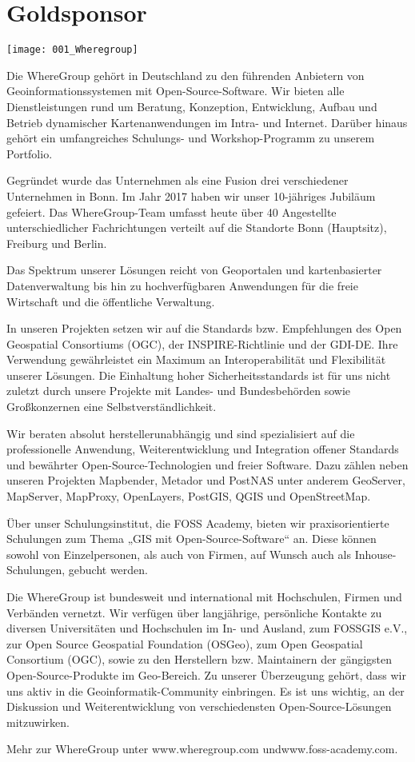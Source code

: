 \section*{Goldsponsor}
\begin{center}
	\texttt{[image: 001\_Wheregroup]}
\end{center}
Die WhereGroup gehört in Deutschland zu den führenden Anbietern von Geoinformationssystemen mit
Open-Source-Software. Wir bieten alle Dienstleistungen rund um Beratung, Konzeption, Entwicklung,
Aufbau und Betrieb dynamischer Kartenanwendungen im Intra- und Internet. Darüber hinaus gehört ein
umfangreiches Schulungs- und Workshop-Programm zu unserem Portfolio.

Gegründet wurde das Unternehmen als eine Fusion drei verschiedener Unternehmen in Bonn. Im Jahr 2017
haben wir unser 10-jähriges Jubiläum gefeiert. Das WhereGroup-Team umfasst heute über 40 Angestellte
unterschiedlicher Fachrichtungen verteilt auf die Standorte Bonn (Hauptsitz), Freiburg und Berlin.

Das Spektrum unserer Lösungen reicht von Geoportalen und kartenbasierter Datenverwaltung bis hin zu
hochverfügbaren Anwendungen für die freie Wirtschaft und die öffentliche Verwaltung.

In unseren Projekten setzen wir auf die Standards bzw. Empfehlungen des Open Geospatial Consortiums
(OGC), der INSPIRE-Richtlinie und der GDI-DE. Ihre Verwendung gewährleistet ein Maximum an
Interoperabilität und Flexibilität unserer Lösungen. Die Einhaltung hoher Sicherheitsstandards ist
für uns nicht zuletzt durch unsere Projekte mit Landes- und Bundesbehörden sowie Großkonzernen eine
Selbstverständlichkeit.

Wir beraten absolut herstellerunabhängig und sind spezialisiert auf die professionelle Anwendung,
Weiterentwicklung und Integration offener Standards und bewährter Open-Source-Tech\-no\-logien und
freier Software. Dazu zählen neben unseren Projekten Mapbender, Metador und PostNAS unter anderem
GeoServer, MapServer, MapProxy, OpenLayers, PostGIS, QGIS und OpenStreetMap.

Über unser Schulungsinstitut, die FOSS Academy, bieten wir praxisorientierte Schulungen zum Thema
„GIS mit Open-Source-Software“ an. Diese können sowohl von Einzelpersonen, als auch von Firmen, auf
Wunsch auch als Inhouse-Schulungen, gebucht werden.

Die WhereGroup ist bundesweit und international mit Hochschulen, Firmen und Verbänden vernetzt. Wir
verfügen über langjährige, persönliche Kontakte zu diversen Universitäten und Hochschulen im In- und
Ausland, zum FOSSGIS e.V., zur Open Source Geospatial Foundation (OSGeo), zum Open Geospatial
Consortium (OGC), sowie zu den Herstellern bzw. Maintainern der gängigsten Open-Source-Produkte im
Geo-Bereich. Zu unserer Überzeugung gehört, dass wir uns aktiv in die Geoinformatik-Community
einbringen. Es ist uns wichtig, an der Diskussion und Weiterentwicklung von verschiedensten
Open-Source-Lösungen mitzuwirken.

Mehr zur WhereGroup unter www.wheregroup.com und\linebreak \mbox{www.foss-academy.com}.
